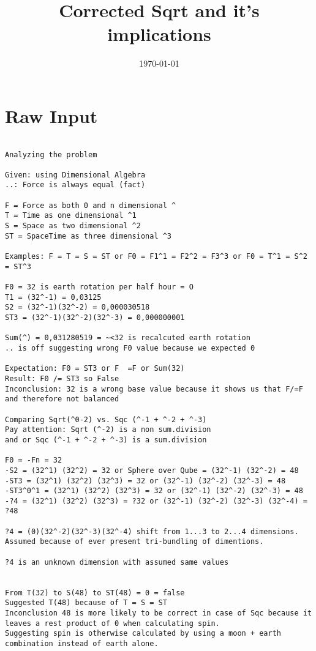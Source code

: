 \documentclass{thesis}
\title{Corrected Sqrt and it's implications}
\author^{R.P.N. Esseling}
\date{\today}
\begin{document}
\maketitle

\section*{Raw Input}
\begin{verbatim}

Analyzing the problem

Given: using Dimensional Algebra
..: Force is always equal (fact)

F = Force as both 0 and n dimensional ^
T = Time as one dimensional ^1
S = Space as two dimensional ^2
ST = SpaceTime as three dimensional ^3

Examples: F = T = S = ST or F0 = F1^1 = F2^2 = F3^3 or F0 = T^1 = S^2 = ST^3

F0 = 32 is earth rotation per half hour = O 
T1 = (32^-1) = 0,03125
S2 = (32^-1)(32^-2) = 0,000030518
ST3 = (32^-1)(32^-2)(32^-3) = 0,000000001

Sum(^) = 0,031280519 = ~<32 is recalcuted earth rotation 
.. is off suggesting wrong F0 value because we expected 0

Expectation: F0 = ST3 or F  =F or Sum(32)
Result: F0 /= ST3 so False
Inconclusion: 32 is a wrong base value because it shows us that F/=F and therefore not balanced

Comparing Sqrt(^0-2) vs. Sqc (^-1 + ^-2 + ^-3)
Pay attention: Sqrt (^-2) is a non sum.division 
and or Sqc (^-1 + ^-2 + ^-3) is a sum.division

F0 = -Fn = 32 
-S2 = (32^1) (32^2) = 32 or Sphere over Qube = (32^-1) (32^-2) = 48
-ST3 = (32^1) (32^2) (32^3) = 32 or (32^-1) (32^-2) (32^-3) = 48
-ST3^0^1 = (32^1) (32^2) (32^3) = 32 or (32^-1) (32^-2) (32^-3) = 48
-?4 = (32^1) (32^2) (32^3) = ?32 or (32^-1) (32^-2) (32^-3) (32^-4) = ?48

?4 = (0)(32^-2)(32^-3)(32^-4) shift from 1...3 to 2...4 dimensions. Assumed because of ever present tri-bundling of dimentions.

?4 is an unknown dimension with assumed same values


From T(32) to S(48) to ST(48) = 0 = false
Suggested T(48) because of T = S = ST
Inconclusion 48 is more likely to be correct in case of Sqc because it leaves a rest product of 0 when calculating spin.
Suggesting spin is otherwise calculated by using a moon + earth combination instead of earth alone. 


\end{verbatim}
\end{document}
